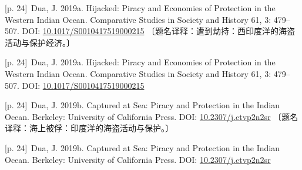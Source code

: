 \documentclass[10pt,a4paper]{article}
\begin{document}
\noindent\begin{minipage}{\textwidth}\begin{minipage}[t]{\dimexpr.5\textwidth-4mm\relax}\noindent\begin{minipage}[t]{\linewidth}{\scriptsize\color{gray} [p. 24]}\ Dua, J. 2019a. Hijacked: Piracy and Economies of Protection in the Western Indian Ocean. Comparative Studies in Society and History 61, 3: 479–507. DOI: \url{10.1017/S0010417519000215} 〔题名译释：遭到劫持：西印度洋的海盗活动与保护经济。〕\par\end{minipage}\par\end{minipage}\hfill\begin{minipage}[t]{\dimexpr.5\textwidth-4mm\relax}\noindent\begin{minipage}[t]{\linewidth}{\scriptsize\color{gray} [p. 24]}\ Dua, J. 2019a. Hijacked: Piracy and Economies of Protection in the Western Indian Ocean. Comparative Studies in Society and History 61, 3: 479–507. DOI: \url{10.1017/S0010417519000215}\par\end{minipage}\par\end{minipage}\end{minipage}\par
\noindent\begin{minipage}{\textwidth}\begin{minipage}[t]{\dimexpr.5\textwidth-4mm\relax}\noindent\begin{minipage}[t]{\linewidth}{\scriptsize\color{gray} [p. 24]}\ Dua, J. 2019b. Captured at Sea: Piracy and Protection in the Indian Ocean. Berkeley: University of California Press. DOI: \url{10.2307/j.ctvp2n2sr} 〔题名译释：海上被俘：印度洋的海盗活动与保护。〕\par\end{minipage}\par\end{minipage}\hfill\begin{minipage}[t]{\dimexpr.5\textwidth-4mm\relax}\noindent\begin{minipage}[t]{\linewidth}{\scriptsize\color{gray} [p. 24]}\ Dua, J. 2019b. Captured at Sea: Piracy and Protection in the Indian Ocean. Berkeley: University of California Press. DOI: \url{10.2307/j.ctvp2n2sr}\par\end{minipage}\par\end{minipage}\end{minipage}\par
\end{document}
